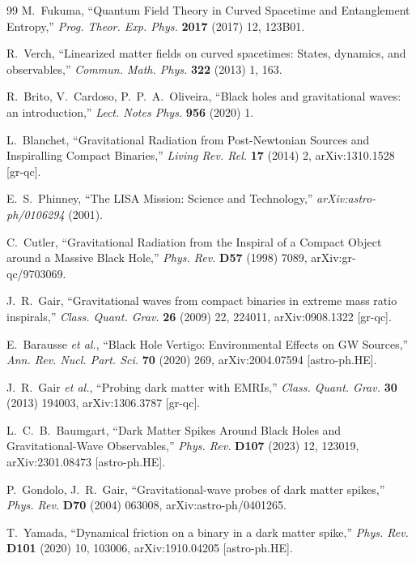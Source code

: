 \documentclass[11pt]{article}
\begin{document}
\begin{thebibliography}{99}
 M.~Fukuma, ``Quantum Field Theory in Curved Spacetime and Entanglement Entropy,'' \textit{Prog. Theor. Exp. Phys.} \textbf{2017} (2017) 12, 123B01.

 R.~Verch, ``Linearized matter fields on curved spacetimes: States, dynamics, and observables,'' \textit{Commun. Math. Phys.} \textbf{322} (2013) 1, 163.

 R.~Brito, V.~Cardoso, P.~P.~A.~Oliveira, ``Black holes and gravitational waves: an introduction,'' \textit{Lect. Notes Phys.} \textbf{956} (2020) 1.

 L.~Blanchet, ``Gravitational Radiation from Post-Newtonian Sources and Inspiralling Compact Binaries,'' \textit{Living Rev. Rel.} \textbf{17} (2014) 2, arXiv:1310.1528 [gr-qc].

 E.~S.~Phinney, ``The LISA Mission: Science and Technology,'' \textit{arXiv:astro-ph/0106294} (2001).

 C.~Cutler, ``Gravitational Radiation from the Inspiral of a Compact Object around a Massive Black Hole,'' \textit{Phys. Rev.} \textbf{D57} (1998) 7089, arXiv:gr-qc/9703069.

 J.~R.~Gair, ``Gravitational waves from compact binaries in extreme mass ratio inspirals,'' \textit{Class. Quant. Grav.} \textbf{26} (2009) 22, 224011, arXiv:0908.1322 [gr-qc].

 E.~Barausse \textit{et al.}, ``Black Hole Vertigo: Environmental Effects on GW Sources,'' \textit{Ann. Rev. Nucl. Part. Sci.} \textbf{70} (2020) 269, arXiv:2004.07594 [astro-ph.HE].

 J.~R.~Gair \textit{et al.}, ``Probing dark matter with EMRIs,'' \textit{Class. Quant. Grav.} \textbf{30} (2013) 194003, arXiv:1306.3787 [gr-qc].

 L.~C.~B.~Baumgart, ``Dark Matter Spikes Around Black Holes and Gravitational-Wave Observables,'' \textit{Phys. Rev.} \textbf{D107} (2023) 12, 123019, arXiv:2301.08473 [astro-ph.HE].

 P.~Gondolo, J.~R.~Gair, ``Gravitational-wave probes of dark matter spikes,'' \textit{Phys. Rev.} \textbf{D70} (2004) 063008, arXiv:astro-ph/0401265.

 T.~Yamada, ``Dynamical friction on a binary in a dark matter spike,'' \textit{Phys. Rev.} \textbf{D101} (2020) 10, 103006, arXiv:1910.04205 [astro-ph.HE].


\end{thebibliography}
\end{document}
